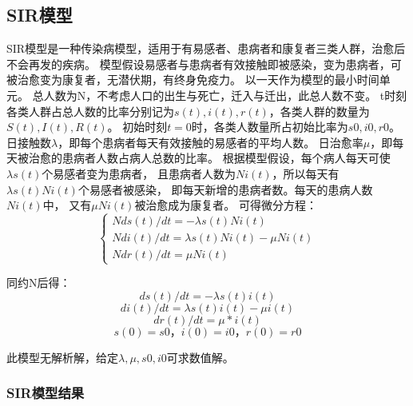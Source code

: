 \documentclass{article}
\begin{document}
\subsection*{SIR模型}
SIR模型是一种传染病模型，适用于有易感者、患病者和康复者三类人群，治愈后不会再发的疾病。
模型假设易感者与患病者有效接触即被感染，变为患病者，可被治愈变为康复者，无潜伏期，有终身免疫力。
以一天作为模型的最小时间单元。
总人数为N，不考虑人口的出生与死亡，迁入与迁出，此总人数不变。
t时刻各类人群占总人数的比率分别记为$s(t),i(t),r(t)$，各类人群的数量为$S(t),I(t),R(t)$。
初始时刻$t=0$时，各类人数量所占初始比率为$s0,i0,r0$。
日接触数$\lambda$，即每个患病者每天有效接触的易感者的平均人数。
日治愈率$\mu$，即每天被治愈的患病者人数占病人总数的比率。
根据模型假设，每个病人每天可使$\lambda s(t)$个易感者变为患病者，
且患病者人数为$Ni(t)$，所以每天有$\lambda s(t)Ni(t)$个易感者被感染，
即每天新增的患病者数。每天的患病人数$Ni(t)$中，
又有$\mu Ni(t)$被治愈成为康复者。
可得微分方程：
$$\begin{cases}
    Nds(t)/dt=-\lambda s(t)Ni(t)\\
    Ndi(t)/dt=\lambda s(t)Ni(t)-\mu Ni(t)\\
    Ndr(t)/dt=\mu Ni(t)
\end{cases}$$

同约N后得：
$$ds(t)/dt=-\lambda s(t)i(t)$$
$$di(t)/dt=\lambda s(t)i(t)-\mu i(t)$$
$$dr(t)/dt=\mu *i(t)$$
$$s(0)=s0，i(0)=i0，r(0)=r0$$

此模型无解析解，给定$\lambda ,\mu ,s0,i0$可求数值解。
\subsubsection*{SIR模型结果}

\begin{figure}[h!]
    \centering
        
\end{figure}
\end{document}
